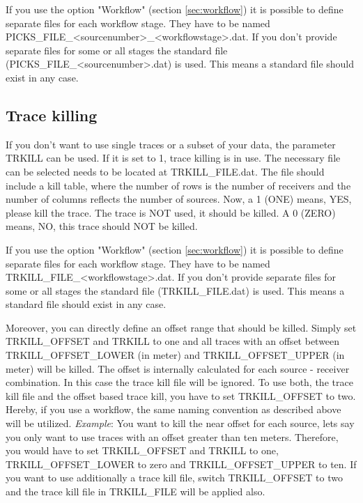 If you use the option "Workflow" (section \ref{sec:workflow}) it is possible to define separate files for each workflow stage. They have to be named PICKS\_FILE\_<sourcenumber>\_<workflowstage>.dat. If you don't provide separate files for some or all stages the standard file (PICKS\_FILE\_<sourcenumber>.dat) is used. This means a standard file should exist in any case.

\subsection{Trace killing}
\label{sec:trace_killing}
{\color{blue}{\begin{verbatim}
"Trace killing" : "comment",
			"TRKILL" : "0",
			"TRKILL_FILE" : "./trace_kill/trace_kill",
			
			"TRKILL_OFFSET" : "0",
			"TRKILL_OFFSET_LOWER" : "20",
			"TRKILL_OFFSET_UPPER" : "100",
\end{verbatim}}}

{\color{red}{\begin{verbatim}
Default values are:
	TRKILL=0
\end{verbatim}}}

If you don't want to use single traces or a subset of your data, the parameter TRKILL can be used. If it is set to 1, trace killing is in use. The necessary file can be selected needs to be located at TRKILL\_FILE.dat. The file should include a kill table, where the number of rows is the number of receivers and the number of columns reflects the number of sources. Now, a 1 (ONE) means, YES, please kill the trace. The trace is NOT used, it should be killed. A 0 (ZERO) means, NO, this trace should NOT be killed. 

If you use the option "Workflow" (section \ref{sec:workflow}) it is possible to define separate files for each workflow stage. They have to be named TRKILL\_FILE\_<workflowstage>.dat. If you don't provide separate files for some or all stages the standard file (TRKILL\_FILE.dat) is used. This means a standard file should exist in any case.

Moreover, you can directly define an offset range that should be killed. Simply set TRKILL\_OFFSET and TRKILL to one and all traces with an offset between TRKILL\_OFFSET\_LOWER (in meter) and TRKILL\_OFFSET\_UPPER (in meter) will be killed. The offset is internally calculated for each source - receiver combination.  In this case the trace kill file will be ignored. To use both, the trace kill file and the offset based trace kill, you have to set TRKILL\_OFFSET to two. Hereby, if you use a workflow, the same naming convention as described above will be utilized. 
\textit{Example}: You want to kill the near offset for each source, lets say you only want to use traces with an offset greater than ten meters. Therefore, you would have to set TRKILL\_OFFSET and TRKILL to one, TRKILL\_OFFSET\_LOWER to zero and TRKILL\_OFFSET\_UPPER to ten. If you want to use additionally a trace kill file, switch TRKILL\_OFFSET to two and the trace kill file in TRKILL\_FILE will be applied also.

